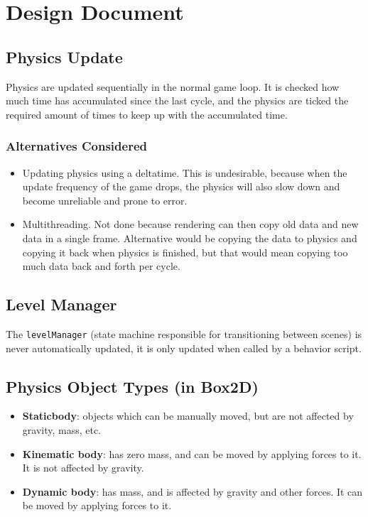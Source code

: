 \documentclass{article}
\begin{document}
\section*{Design Document}

\subsection{Physics Update}
Physics are updated sequentially in the normal game loop. It is checked how much time has accumulated since the last cycle, and the physics are ticked the required amount of times to keep up with the accumulated time.

\subsubsection{Alternatives Considered}
\begin{itemize}
  \item Updating physics using a deltatime. This is undesirable, because when the update frequency of the game drops, the physics will also slow down and become unreliable and prone to error.
  \item Multithreading. Not done because rendering can then copy old data and new data in a single frame. Alternative would be copying the data to physics and copying it back when physics is finished, but that would mean copying too much data back and forth per cycle.
\end{itemize}

\subsection{Level Manager}
The \texttt{levelManager} (state machine responsible for transitioning between scenes) is never automatically updated, it is only updated when called by a behavior script.

\subsection{Physics Object Types (in Box2D)}
\begin{itemize}
  \item \textbf{Staticbody}: objects which can be manually moved, but are not affected by gravity, mass, etc.
  \item \textbf{Kinematic body}: has zero mass, and can be moved by applying forces to it. It is not affected by gravity.
  \item \textbf{Dynamic body}: has mass, and is affected by gravity and other forces. It can be moved by applying forces to it.
\end{itemize}
\end{document}

